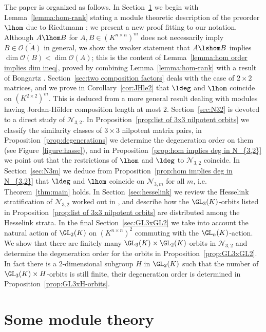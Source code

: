 \documentclass[12pt]{amsart}
\newcommand{\field}{K}
\begin{document}
The paper is organized as follows. 
 In Section~\ref{sec:module theory} we begin with Lemma~\ref{lemma:hom-rank} stating a module theoretic description 
 of the preorder $\lhom$ due to Riedtmann \cite{Riedtmann1}; we present a new proof fitting to our notation. 
 Although $A\lhom B$ for $A,B\in (\field^{n\times n})^m$ does not necessarily imply $B\in \overline{\mathcal{O}(A)}$ in general, we show the weaker statement that $A\lshom B$ implies $\dim \mathcal{O}(B)<\dim \mathcal{O}(A)$; 
 this is the content of Lemma~\ref{lemma:hom order implies dim ineq}, 
proved by combining Lemma~\ref{lemma:hom-rank} with a result of Bongartz \cite{Bongartz2}. 
Section~\ref{sec:two composition factors} deals with the case of $2\times 2$ matrices, and we prove in 
Corollary~\ref{cor:JHle2} that $\ldeg$ and $\lhom$ coincide on $(\field^{2\times 2})^m$. 
This is deduced from a more general result 
dealing with modules having Jordan-Hölder composition length at most $2$. 
Section~\ref{sec:N32} is devoted to a direct study of $\mathcal{N}_{3,2}$. 
In Proposition~\ref{prop:list of 3x3 nilpotent orbits} we classify 
the similarity classes of $3\times 3$ nilpotent matrix pairs,  
in Proposition~\ref{prop:degenerations} we determine the degeneration order on them 
(see Figure~\ref{figure:hasse}),  
and in Proposition~\ref{prop:hom implies deg in N_{3,2}} we point out that 
the restrictions of $\lhom$ and $\ldeg$ to $\mathcal{N}_{3,2}$ coincide. 
In Section~\ref{sec:N3m} we deduce from Proposition~\ref{prop:hom implies deg in N_{3,2}} 
that $\ldeg$ and $\lhom$ coincide on $\mathcal{N}_{3,m}$ for all $m$, i.e. 
Theorem~\ref{thm:main} holds. 
In Section~\ref{sec:hesselink} we review the Hesselink stratification of $\mathcal{N}_{3,2}$ worked out in 
\cite{lebruyn}, and describe how the $\GL_3(\field)$-orbits listed in Proposition~\ref{prop:list of 3x3 nilpotent orbits} are distributed among the Hesselink strata. In the final Section~\ref{sec:GL3xGL2} 
we take into account the natural action of $\GL_2(\field)$ 
on $(\field^{n\times n})^2$ commuting with the $\GL_n(\field)$-action.  
We show that there are finitely many $\GL_3(\field)\times \GL_2(\field)$-orbits 
in $\mathcal{N}_{3,2}$ and determine the degeneration order for the orbits 
in Proposition~\ref{prop:GL3xGL2}. In fact there is a $2$-dimensional subgroup 
$H$ in $\GL_2(\field)$ such that the number of 
$\GL_3(\field)\times H$-orbits is still finite, their degeneration order is determined 
in Proposition~\ref{prop:GL3xH-orbits}. 


\section{Some module theory}\label{sec:module theory} 
\end{document}
